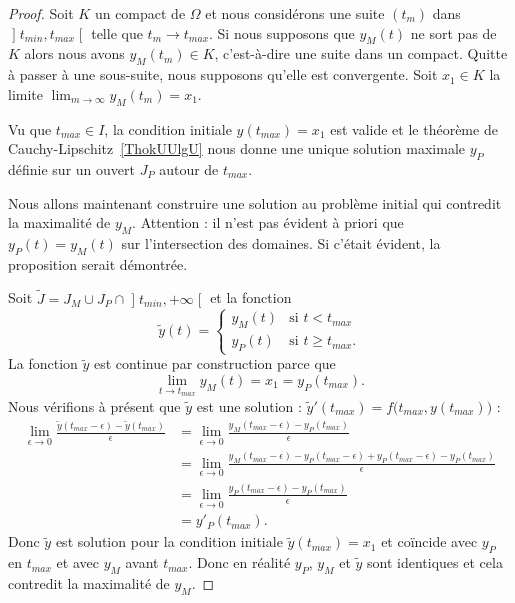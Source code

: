 \begin{proof}
	Soit \( K\) un compact de \( \Omega\) et nous considérons une suite \( (t_m)\) dans \( \mathopen] t_{min} , t_{max} \mathclose[\) telle que \( t_m\to t_{max}\). Si nous supposons que \( y_M(t)\) ne sort pas de \( K\) alors nous avons \( y_M(t_m)\in K\), c'est-à-dire une suite dans un compact. Quitte à passer à une sous-suite, nous supposons qu'elle est convergente. Soit \( x_1\in K\) la limite \( \lim_{m\to \infty}y_M(t_m)=x_1\).

		Vu que \( t_{max}\in I\), la condition initiale \( y(t_{max})=x_1\) est valide et le théorème de Cauchy-Lipschitz~\ref{ThokUUlgU} nous donne une unique solution maximale \( y_P\) définie sur un ouvert \( J_P\) autour de \( t_{max}\).

		Nous allons maintenant construire une solution au problème initial qui contredit la maximalité de \( y_M\). Attention : il n'est pas évident à priori que \( y_P(t)=y_M(t)\) sur l'intersection des domaines. Si c'était évident, la proposition serait démontrée.

		Soit \( \tilde J=J_M\cup J_P\cap\mathopen] t_{min} , +\infty \mathclose[\) et la fonction
	\begin{equation}
		\tilde y(t)=\begin{cases}
			y_M(t) & \text{si } t<t_{max}      \\
			y_P(t) & \text{si } t\geq t_{max}.
		\end{cases}
	\end{equation}
	La fonction \( \tilde y\) est continue par construction parce que
	\begin{equation}
		\lim_{t\to t_{max}} y_M(t)=x_1=y_P(t_{max}).
	\end{equation}
	Nous vérifions à présent que \( \tilde y\) est une solution : \( \tilde y'(t_{max})=f\big( t_{max},y(t_{max}) \big)\) :
	\begin{subequations}
		\begin{align}
			\lim_{\epsilon\to 0}\frac{ \tilde y(t_{max}-\epsilon)-\tilde y(t_{max}) }{ \epsilon } & =\lim_{\epsilon\to 0}\frac{ y_M(t_{max}-\epsilon)-y_P(t_{max}) }{ \epsilon }                                             \\
			                                                                                      & =\lim_{\epsilon\to 0}\frac{ y_M(t_{max}-\epsilon)-y_P(t_{max}-\epsilon)+y_P(t_{max}-\epsilon)-y_P(t_{max}) }{ \epsilon } \\
			                                                                                      & =\lim_{\epsilon\to 0}\frac{ y_P(t_{max}-\epsilon)-y_P(t_{max}) }{ \epsilon }                                             \\
			                                                                                      & =y'_P(t_{max}).
		\end{align}
	\end{subequations}
	Donc \( \tilde y\) est solution pour la condition initiale \( \tilde y(t_{max})=x_1\) et coïncide avec \( y_P\) en \( t_{max}\) et avec \( y_M\) avant \( t_{max}\). Donc en réalité \( y_P\), \( y_M\) et \( \tilde y\) sont identiques et cela contredit la maximalité de \( y_M\).
\end{proof}

